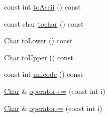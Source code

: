 \begin{DoxyCompactItemize}
\item 
const int \hyperlink{classprism_1_1_char_a26d719979d33ddc420591eb92fbf3bfc}{to\+Ascii} () const 
\item 
const char \hyperlink{classprism_1_1_char_aefd335b68105adc4a7904b5f6bdd6d3e}{tochar} () const 
\item 
\hyperlink{classprism_1_1_char}{Char} \hyperlink{classprism_1_1_char_af145ceb6a02081c5562871a13a865429}{to\+Lower} () const 
\item 
\hyperlink{classprism_1_1_char}{Char} \hyperlink{classprism_1_1_char_a1c34ae303e604dc91000427cea3c0934}{to\+Upper} () const 
\item 
const int \hyperlink{classprism_1_1_char_aca9ed86a1bdd3105a97cf60396b8e943}{unicode} () const 
\item 
\hyperlink{classprism_1_1_char}{Char} \& \hyperlink{classprism_1_1_char_aa3b743c885e9df1b404ce083737aed75}{operator+=} (const int i)
\item 
\hyperlink{classprism_1_1_char}{Char} \& \hyperlink{classprism_1_1_char_ac45754839e3025c5de4655b3eec4c3c6}{operator-\/=} (const int i)
\end{DoxyCompactItemize}
